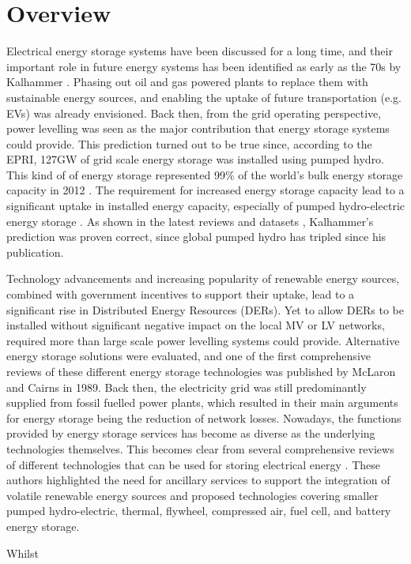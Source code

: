 \section{Overview}
\label{ch-review:sec:overview}

Electrical energy storage systems have been discussed for a long time, and their important role in future energy systems has been identified as early as the 70s by Kalhammer \cite{Kalhammer1979}. Phasing out oil and gas powered plants to replace them with sustainable energy sources, and enabling the uptake of future transportation (e.g. EVs) was already envisioned. Back then, from the grid operating perspective, power levelling was seen as the major contribution that energy storage systems could provide. This prediction turned out to be true since, according to the EPRI, 127GW of grid scale energy storage was installed using pumped hydro. This kind of of energy storage represented 99\% of the world's bulk energy storage capacity in 2012 \cite{TheEconomist2012a}. The requirement for increased energy storage capacity lead to a significant uptake in installed energy capacity, especially of pumped hydro-electric energy storage \cite{Rehman2015}. As shown in the latest reviews and datasets \cite{Barbour2016, Barbour2015}, Kalhammer's prediction was proven correct, since global pumped hydro has tripled since his publication.

Technology advancements and increasing popularity of renewable energy sources, combined with government incentives to support their uptake, lead to a significant rise in Distributed Energy Resources (DERs). Yet to allow DERs to be installed without significant negative impact on the local MV or LV networks, required more than large scale power levelling systems could provide. Alternative energy storage solutions were evaluated, and one of the first comprehensive reviews of these different energy storage technologies was published by McLaron and Cairns \cite{McLarnon1989} in 1989. Back then, the electricity grid was still predominantly supplied from fossil fuelled power plants, which resulted in their main arguments for energy storage being the reduction of network losses. Nowadays, the functions provided by energy storage services has become as diverse as the underlying technologies themselves. This becomes clear from several comprehensive reviews of different technologies that can be used for storing electrical energy \cite{Ibrahim2008, Chen2009, Hadjipaschalis2009, Luo2015}. These authors highlighted the need for ancillary services to support the integration of volatile renewable energy sources and proposed technologies covering smaller pumped hydro-electric, thermal, flywheel, compressed air, fuel cell, and battery energy storage. 

Whilst 